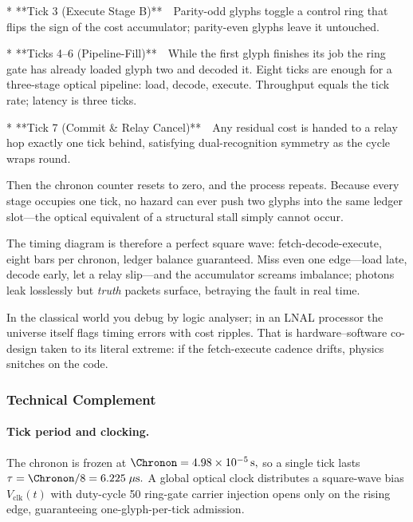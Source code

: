\documentclass[11pt,oneside]{book}
\begin{document}
* **Tick 3 (Execute Stage B)** Parity-odd glyphs toggle a control ring
  that flips the sign of the cost accumulator; parity-even glyphs
  leave it untouched.  

* **Ticks 4–6 (Pipeline-Fill)** While the first glyph finishes its job
  the ring gate has already loaded glyph two and decoded it. Eight
  ticks are enough for a three-stage optical pipeline: load, decode,
  execute. Throughput equals the tick rate; latency is three ticks.

* **Tick 7 (Commit & Relay Cancel)** Any residual cost is handed to a
  relay hop exactly one tick behind, satisfying dual-recognition
  symmetry as the cycle wraps round.

Then the chronon counter resets to zero, and the process repeats.
Because every stage occupies one tick, no hazard can ever push two
glyphs into the same ledger slot—the optical equivalent of a
structural stall simply cannot occur.  

The timing diagram is therefore a perfect square wave:  
fetch-decode-execute, eight bars per chronon, ledger balance
guaranteed.  
Miss even one edge—load late, decode early, let a relay slip—and the
accumulator screams imbalance; photons leak losslessly but
\emph{truth} packets surface, betraying the fault in real time.

In the classical world you debug by logic analyser;  
in an LNAL processor the universe itself flags timing errors with
cost ripples. That is hardware–software co-design taken to its
literal extreme: if the fetch-execute cadence drifts, physics snitches
on the code.


\subsubsection*{Technical Complement}

\paragraph{Tick period and clocking.}
The chronon is frozen at  
\(
   \Chronon = 4.98\times10^{-5}\,\mathrm{s},
\)
so a single tick lasts  
\(
   \tau = \Chronon/8 = 6.225\;\mu\mathrm{s}.
\)
A global optical clock distributes a square-wave bias \(V_{\!\mathrm{clk}}(t)\)
with duty-cycle 50 %
ring-gate carrier injection opens only on the rising edge, guaranteeing
one-glyph-per-tick admission.
\end{document}
